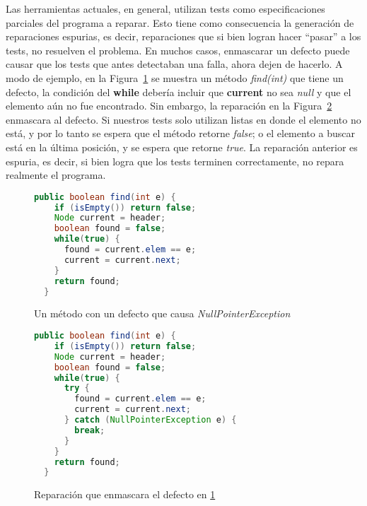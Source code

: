 Las herramientas actuales, en general, utilizan tests como especificaciones parciales del programa a reparar. Esto tiene como consecuencia la generaci\'on de reparaciones espurias, es decir, reparaciones que si bien logran hacer ``pasar'' a los tests, no resuelven el problema. En muchos casos, enmascarar un defecto puede causar que los tests que antes detectaban una falla, ahora dejen de hacerlo. A modo de ejemplo, en la Figura~\ref{figures.examples.repair.nullaccessexample} se muestra un m\'etodo \emph{find(int)} que tiene un defecto, la condici\'on del \textbf{while} deber\'ia incluir que \textbf{current} no sea \emph{null} y que el elemento a\'un no fue encontrado. Sin embargo, la reparaci\'on en la Figura~\ref{figures.examples.repair.nullaccessexample.mask} enmascara al defecto. Si nuestros tests solo utilizan listas en donde el elemento no est\'a, y por lo tanto se espera que el m\'etodo retorne \emph{false}; o el elemento a buscar est\'a en la \'ultima posici\'on, y se espera que retorne \emph{true}. La reparaci\'on anterior es espuria, es decir, si bien logra que los tests terminen correctamente, no repara realmente el programa.

\begin{figure}
	\begin{lstlisting}[frame=single, mathescape=true,language=Java,basicstyle={},framexleftmargin=.073\textwidth,xleftmargin=.085\textwidth,xrightmargin=0.012\textwidth]
  public boolean find(int e) {
    if (isEmpty()) return false;
    Node current = header;
    boolean found = false;
    while(true) {
      found = current.elem == e;
      current = current.next;
    }
    return found;
  }
	\end{lstlisting}
	\caption{Un m\'etodo con un defecto que causa \emph{NullPointerException}}
	\label{figures.examples.repair.nullaccessexample}
\end{figure}

\begin{figure}
	\begin{lstlisting}[frame=single, mathescape=true,language=Java,basicstyle={},framexleftmargin=.073\textwidth,xleftmargin=.085\textwidth,xrightmargin=0.012\textwidth]
  public boolean find(int e) {
    if (isEmpty()) return false;
    Node current = header;
    boolean found = false;
    while(true) {
      try {
        found = current.elem == e;
        current = current.next;
      } catch (NullPointerException e) {
        break;
      }
    }
    return found;
  }
	\end{lstlisting}
	\caption{Reparaci\'on que enmascara el defecto en \ref{figures.examples.repair.nullaccessexample}}
	\label{figures.examples.repair.nullaccessexample.mask}
\end{figure}

